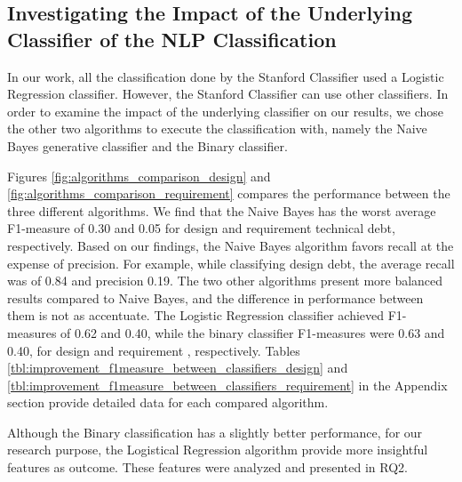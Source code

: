 \subsection{Investigating the Impact of the Underlying Classifier of the NLP Classification}
\label{sec:underlying_classifier}
In our work, all the classification done by the Stanford Classifier used a Logistic Regression classifier. However, the Stanford Classifier can use other classifiers. In order to examine the impact of the underlying classifier on our results, we chose the other two algorithms to execute the classification with, namely the Naive Bayes generative classifier and the Binary classifier.

Figures \ref{fig:algorithms_comparison_design} and \ref{fig:algorithms_comparison_requirement} compares the performance between the three different algorithms. We find that the Naive Bayes has the worst average F1-measure of 0.30 and 0.05 for design and requirement technical debt, respectively. Based on our findings, the Naive Bayes algorithm favors recall at the expense of precision. For example, while classifying design debt, the average recall was of 0.84 and precision 0.19. The two other algorithms present more balanced results compared to Naive Bayes, and the difference in performance between them is not as accentuate. The Logistic Regression classifier achieved F1-measures of 0.62 and 0.40, while the binary classifier F1-measures were 0.63 and 0.40, for design and requirement \SATD, respectively. Tables \ref{tbl:improvement_f1measure_between_classifiers_design} and \ref{tbl:improvement_f1measure_between_classifiers_requirement} in the Appendix section provide detailed data for each compared algorithm.  

Although the Binary classification has a slightly better performance, for our research purpose, the Logistical Regression algorithm provide more insightful features as outcome. These features were analyzed and presented in RQ2. 

